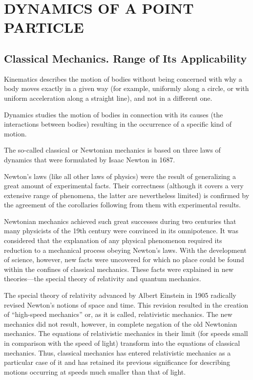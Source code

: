 

\chapter{DYNAMICS OF A POINT PARTICLE}\label{chap:2}

\section{Classical Mechanics. Range of Its Applicability}\label{sec:2_1}

Kinematics describes the motion of bodies without being concerned with why a body moves exactly in a given way (for example, uniformly along a circle, or with uniform acceleration along a straight line), and not in a different one.

Dynamics studies the motion of bodies in connection with its causes (the interactions between bodies) resulting in the occurrence of a specific kind of motion.

The so-called classical or Newtonian mechanics is based on three laws of dynamics that were formulated by Isaac Newton in 1687.

Newton's laws (like all other laws of physics) were the result of generalizing a great amount of experimental facts. Their correctness (although it covers a very extensive range of phenomena, the latter are nevertheless limited) is confirmed by the agreement of the corollaries following from them with experimental results.

Newtonian mechanics achieved such great successes during two centuries that many physicists of the 19th century were convinced in its omnipotence. It was considered that the explanation of any physical phenomenon required its reduction to a mechanical process obeying Newton's laws. With the development of science, however, new facts were uncovered for which no place could be found within the confines of classical mechanics. These facts were explained in new theories---the special theory of relativity and quantum mechanics.

The special theory of relativity advanced by Albert Einstein in 1905 radically revised Newton's notions of space and time. This revision resulted in the creation of ``high-speed mechanics'' or, as it is called, relativistic mechanics. The new mechanics did not result, however, in complete negation of the old Newtonian mechanics. The equations of relativistic mechanics in their limit (for speeds small in comparison with the speed of light) transform into the equations of classical mechanics. Thus, classical mechanics has entered relativistic mechanics as a particular case of it and has retained its previous significance for describing motions occurring at speeds much smaller than that of light.

